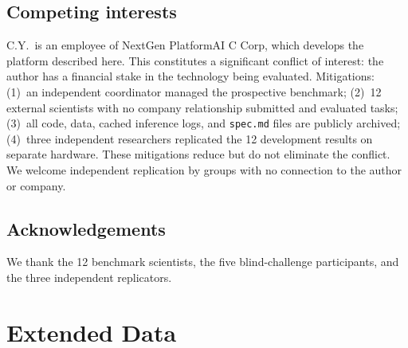 \documentclass[11pt,a4paper]{article}
\begin{document}
\subsection{Competing interests}

C.Y.\ is an employee of NextGen PlatformAI C Corp, which develops the platform described here. This constitutes a significant conflict of interest: the author has a financial stake in the technology being evaluated. Mitigations: (1)~an independent coordinator managed the prospective benchmark; (2)~12 external scientists with no company relationship submitted and evaluated tasks; (3)~all code, data, cached inference logs, and \texttt{spec.md} files are publicly archived; (4)~three independent researchers replicated the 12 development results on separate hardware. These mitigations reduce but do not eliminate the conflict. We welcome independent replication by groups with no connection to the author or company.


\subsection{Acknowledgements}

We thank the 12 benchmark scientists, the five blind-challenge participants, and the three independent replicators.


\clearpage
\section{Extended Data}
\end{document}
